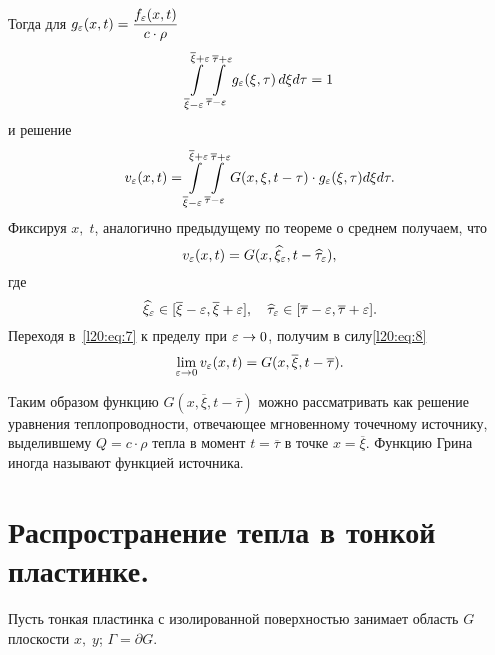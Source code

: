 \noindent Тогда для $\displaystyle g_{\varepsilon}(x,t)=\frac{f_{\varepsilon}(x,t)}{c\cdot\rho}$
\begin{equation*}
	\int\limits_{\overline{\xi}-\varepsilon}^{\overline{\xi}+\varepsilon}\int\limits_{\overline{\tau}-\varepsilon}^{\overline{\tau}+\varepsilon} g_{\varepsilon}(\xi,\tau)\,d\xi d\tau=1
\end{equation*}
и решение 
\begin{equation*}
	v_{\varepsilon}(x,t)=\int\limits_{\overline{\xi}-\varepsilon}^{\overline{\xi}+\varepsilon}\int\limits_{\overline{\tau}-\varepsilon}^{\overline{\tau}+\varepsilon} G(x,\xi,t-\tau)\cdot g_{\varepsilon}(\xi,\tau)d\xi d\tau.
\end{equation*}
Фиксируя $x,\;t$, аналогично предыдущему по теореме о среднем получаем, что 
\begin{equation}\label{l20:eq:7}
	v_{\varepsilon}(x,t)=G(x,\widehat{\xi}_{\varepsilon},t-\widehat{\tau}_{\varepsilon}),
\end{equation}
где
\begin{equation}\label{l20:eq:8}
	\widehat{\xi}_{\varepsilon}\in[\overline{\xi}-\varepsilon,\overline{\xi}+\varepsilon],\quad \widehat{\tau}_{\varepsilon}\in[\overline{\tau}-\varepsilon,\overline{\tau}+\varepsilon].
\end{equation}
Переходя в~\eqref{l20:eq:7} к пределу при $\varepsilon\to0$, получим в силу\eqref{l20:eq:8}
\begin{equation*}
	\lim\limits_{\varepsilon\to0}v_{\varepsilon}(x,t)=G(x,\overline{\xi},t-\overline{\tau}).
\end{equation*} 

Таким образом функцию $G(x,\overline{\xi},t-\overline{\tau})$ можно рассматривать как решение уравнения теплопроводности, отвечающее мгновенному точечному источнику, выделившему $Q=c\cdot\rho$ тепла в момент $t=\overline{\tau}$ в точке $x=\overline{\xi}$. Функцию Грина иногда называют функцией источника.
\section{Распространение тепла в тонкой пластинке.}
\label{lecture20section2}
Пусть тонкая пластинка с изолированной поверхностью занимает область $G$ плоскости $x,\;y$; $\Gamma=\partial G$. 


